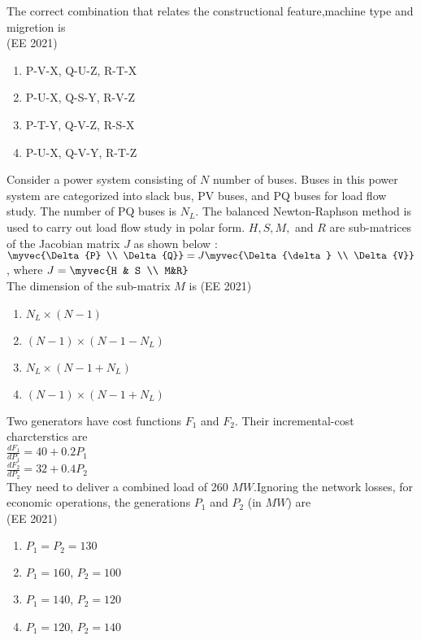 The correct combination that relates the constructional feature,machine type and migretion is \\
\text{ } \hfill{(EE 2021)}
\begin{enumerate}
\item P-V-X, Q-U-Z, R-T-X
\item P-U-X, Q-S-Y, R-V-Z
\item P-T-Y, Q-V-Z, R-S-X
\item P-U-X, Q-V-Y, R-T-Z
\end{enumerate}
\item Consider a power system consisting of $N$ number of buses. Buses in this power system are categorized into slack bus, PV buses, and PQ buses for load flow study. The number of PQ buses is $N_L$. The balanced Newton-Raphson method is used to carry out load flow study in polar form. $H,S,M,$ and $R$ are sub-matrices of the Jacobian matrix $J$ as shown below :\\
$\myvec{\Delta{P} \\ \Delta{Q}} =J\myvec{\Delta{\delta} \\ \Delta{V}}$, where $J=\myvec{H & S \\ M&R}$ \\
The dimension of the sub-matrix $M$ is
\hfill{(EE 2021)}
\begin{enumerate}
\item $N_L\times(N-1)$
\item $(N-1)\times(N-1-N_L)$
\item $N_L\times(N-1+N_L)$
\item $(N-1)\times(N-1+N_L)$
\end{enumerate}
\item Two generators have cost functions $F_1$ and $F_2$. Their incremental-cost charcterstics are \\
$\frac{dF_1}{dP_1} = 40 + 0.2P_1$ \\
$\frac{dF_2}{dP_2} = 32 + 0.4P_2$ \\
They need to deliver a combined load of 260 $MW$.Ignoring the network losses, for economic operations, the generations $P_1$ and $P_2$ (in $MW$) are \\
\text{ } \hfill{(EE 2021)}
\begin{enumerate}
\item $P_1 = P_2 = 130$
\item $P_1=160$, $P_2=100$
\item $P_1=140$, $P_2=120$
\item $P_1=120$, $P_2=140$
\end{enumerate}

